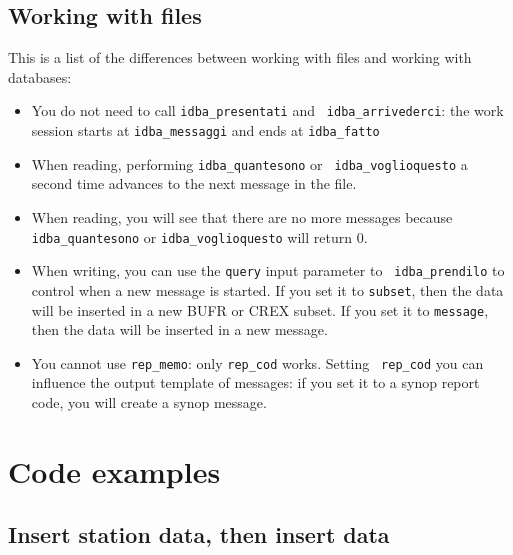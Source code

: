 \documentclass[final,12pt,a4paper,twoside]{book}
\begin{document}
\section{Working with files}
\label{db-file-differences}

This is a list of the differences between working with files and working with
databases:

\begin{itemize}
\item You do not need to call {\tt idba\_presentati} and {\tt
      idba\_arrivederci}: the work session starts at {\tt idba\_messaggi} and ends at
      {\tt idba\_fatto}
\item When reading, performing {\tt idba\_quantesono} or {\tt
      idba\_voglioquesto} a second time advances to the next message in the file.
\item When reading, you will see that there are no more messages because {\tt
      idba\_quantesono} or {\tt idba\_voglioquesto} will return 0.
\item When writing, you can use the {\tt query} input parameter to {\tt
      idba\_prendilo} to control when a new message is started.  If you set it
      to {\tt subset}, then the data will be inserted in a new BUFR or CREX
      subset.  If you set it to {\tt message}, then the data will be inserted
      in a new message.
\item You cannot use {\tt rep\_memo}: only {\tt rep\_cod} works.  Setting {\tt
      rep\_cod} you can influence the output template of messages: if you set it to a
      synop report code, you will create a synop message.
\end{itemize}


\chapter{Code examples}
\label{ch-examples}


\section{Insert station data, then insert data}
\end{document}
